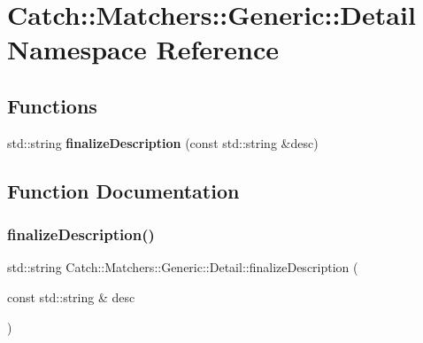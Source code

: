 \section{Catch\+::Matchers\+::Generic\+::Detail Namespace Reference}
\label{namespace_catch_1_1_matchers_1_1_generic_1_1_detail}
\subsection*{Functions}
\begin{DoxyCompactItemize}
\item 
std\+::string \textbf{ finalize\+Description} (const std\+::string \&desc)
\end{DoxyCompactItemize}


\subsection{Function Documentation}
\mbox{\label{namespace_catch_1_1_matchers_1_1_generic_1_1_detail_a79ef1103073f7a8d31735436d2012835}} 
\subsubsection{finalizeDescription()}
{\footnotesize\ttfamily std\+::string Catch\+::\+Matchers\+::\+Generic\+::\+Detail\+::finalize\+Description (\begin{DoxyParamCaption}\item[{const std\+::string \&}]{desc }\end{DoxyParamCaption})}

